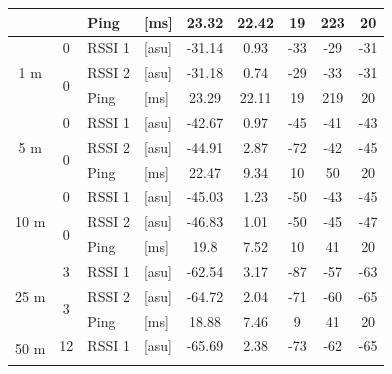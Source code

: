 \begin{table}[H]
\begin{tabular}{|c|c|l|l|c|c|c|c|c|}
        && Ping & [ms] & 23.32 & 22.42 & 19 & 223 & 20 \\\hline\hline
        \multirow{3}{*}{1 m} & \multirow{1}{*}{0} & RSSI 1 & [asu] & -31.14 & 0.93 & -33 & -29 & -31 \\\cline{2-9}\cline{2-9}
        & \multirow{2}{*}{0} & RSSI 2 & [asu] & -31.18 & 0.74 & -29 & -33 & -31 \\\cline{3-9}
        && Ping & [ms] & 23.29 & 22.11 & 19 & 219 & 20 \\\hline\hline
        \multirow{3}{*}{5 m} & \multirow{1}{*}{0} & RSSI 1 & [asu] & -42.67 & 0.97 & -45 & -41 & -43 \\\cline{2-9}\cline{2-9}
        & \multirow{2}{*}{0} & RSSI 2 & [asu] & -44.91 & 2.87 & -72 & -42 & -45 \\\cline{3-9}
        && Ping & [ms] & 22.47 & 9.34 & 10 & 50 & 20 \\\hline\hline
        \multirow{3}{*}{10 m} & \multirow{1}{*}{0} & RSSI 1 & [asu] & -45.03 & 1.23 & -50 & -43 & -45 \\\cline{2-9}\cline{2-9}
        & \multirow{2}{*}{0} & RSSI 2 & [asu] & -46.83 & 1.01 & -50 & -45 & -47 \\\cline{3-9}
        && Ping & [ms] & 19.8 & 7.52 & 10 & 41 & 20 \\\hline\hline
        \multirow{3}{*}{25 m} & \multirow{1}{*}{3} & RSSI 1 & [asu] & -62.54 & 3.17 & -87 & -57 & -63 \\\cline{2-9}\cline{2-9}
        & \multirow{2}{*}{3} & RSSI 2 & [asu] & -64.72 & 2.04 & -71 & -60 & -65 \\\cline{3-9}
        && Ping & [ms] & 18.88 & 7.46 & 9 & 41 & 20 \\\hline\hline
        \multirow{3}{*}{50 m} & \multirow{1}{*}{12} & RSSI 1 & [asu] & -65.69 & 2.38 & -73 & -62 & -65 \\\cline{2-9}\cline{2-9}

\end{tabular}
\end{table}
